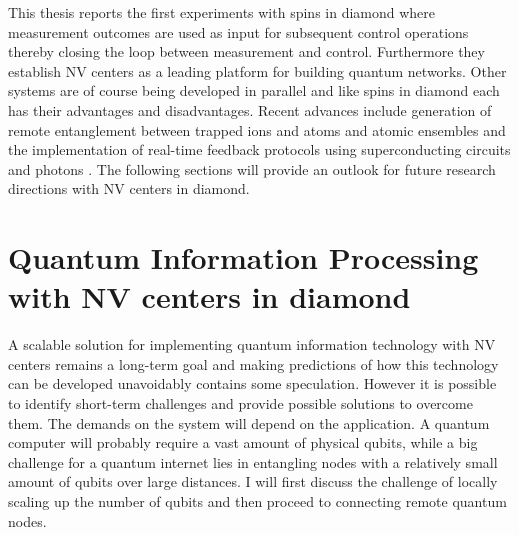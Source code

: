 This thesis reports the first experiments with spins in diamond where measurement outcomes are used as input for subsequent control operations thereby closing the loop between measurement and control. Furthermore they establish NV centers as a leading platform for building quantum networks.  Other systems are of course being developed in parallel and like spins in diamond each has their advantages and disadvantages. Recent advances include generation of remote entanglement between trapped ions \cite{Moehring_Nature_2007} and atoms\cite{Hofmann_Science_2012,Ritter_Nature_2012} and atomic ensembles\cite{Chou_Nature_2005} and the implementation of real-time feedback protocols using superconducting circuits\cite{Vijay_Nature_2012,Riste_Nature_2013} and photons \cite{Gillett_Phys.Rev.Lett._2010,Sayrin_Nature_2011}. The following sections will provide an outlook for future research directions with NV centers in diamond.

\section{Quantum Information Processing with NV centers in diamond}
A scalable solution for implementing quantum information technology with NV centers remains a long-term goal and making predictions of how this technology can be developed unavoidably contains some speculation. However it is possible to identify short-term challenges and provide possible solutions to overcome them. The demands on the system will depend on the application. A quantum computer will probably require a vast amount of physical qubits, while a big challenge for a quantum internet lies in entangling nodes with a relatively small amount of qubits over large distances. I will first discuss the challenge of locally scaling up the number of qubits and then proceed to connecting remote quantum nodes.

